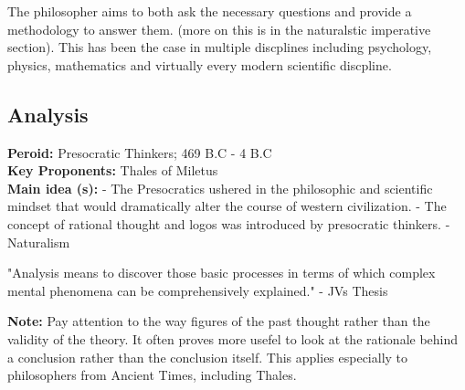 \documentclass[twoside]{article}
\begin{document}
The philosopher aims to both ask the necessary questions and provide a methodology to answer them. (more
on this is in the naturalstic imperative section). This has been the case in multiple
discplines including psychology, physics, mathematics and virtually every modern
scientific discpline.

\subsection{Analysis}
\textbf{Peroid: } Presocratic Thinkers; 469 B.C - 4 B.C \\
\textbf{Key Proponents: } Thales of Miletus \\


\textbf{Main idea (s):}
- The Presocratics ushered in the philosophic and scientific
mindset that would dramatically alter the course of western civilization.
- The concept of rational thought and logos was introduced by presocratic
thinkers.
- Naturalism

"Analysis means to discover those basic processes in terms of which complex mental
phenomena can be comprehensively explained." - JVs Thesis

\textbf{Note: } Pay attention to the way figures of the past thought
rather than the validity of the theory. It often proves more usefel to look at the
rationale behind a conclusion rather than the conclusion itself. This applies especially
to philosophers from Ancient Times, including Thales.
\end{document}
